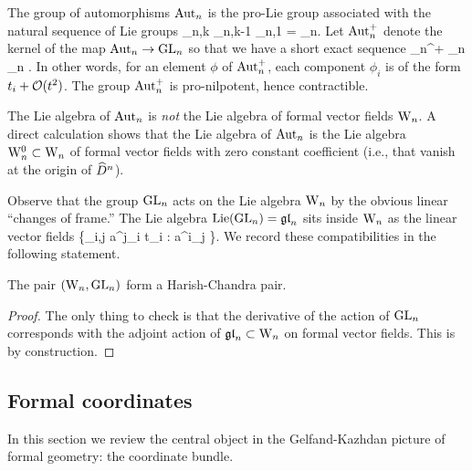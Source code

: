 The group of automorphisms ${\rm Aut}_n$ is the pro-Lie group associated with the natural sequence of Lie groups
\ben
\cdots \to \Aut_{n,k} \to \Aut_{n,k-1} \to \cdots \to \Aut_{n,1} = \GL_n.
\een
Let ${\rm Aut}_n^+$ denote the kernel of the map ${\rm Aut}_n \to {\rm GL}_n$ so that we have a short exact sequence
 \to \Aut_n^+ \to \Aut_n \to \GL_n  .
\een
In other words, for an element $\phi$ of ${\rm Aut}_n^+$, each component
$\phi_i$ is of the form $t_i + \mathcal O(t^2)$. The group ${\rm Aut}_n^+$ is
pro-nilpotent, hence contractible. 

The Lie algebra of ${\rm Aut}_n$ is {\em not} the Lie algebra of formal
vector fields ${{\rm W}_n}$. A direct
calculation shows that the Lie algebra of ${\rm Aut}_n$ is the Lie algebra ${{\rm W}^0_n} \subset {{\rm W}_n}$ of formal vector fields with zero constant coefficient (i.e., that vanish at the origin of $\widehat{D}^n$). 

Observe that the group ${\rm GL}_n$ acts on the Lie algebra ${{\rm W}_n}$ by the obvious linear ``changes of frame.''
The Lie algebra ${\rm Lie}({{\rm GL}_n}) = {\mathfrak{gl}}_n$ sits inside ${{\rm W}_n}$ as the linear vector fields
\ben
\left\{\sum_{i,j} a^j_i t_i  \; : \; a^{i}_j \in \CC \right\}.
\een 
We record these compatibilities in the following statement.

\begin{lem} 
The pair $({{\rm W}_n}, {\rm GL}_n)$ form a Harish-Chandra pair.
\end{lem}
\begin{proof} The only thing to check is that the derivative of the
  action of ${\rm GL}_n$ corresponds with the adjoint action of ${\mathfrak{gl}}_n
  \subset {{\rm W}_n}$ on formal vector fields. This is by construction. 
\end{proof}

\subsection{Formal coordinates}

In this section we review the central object in the Gelfand-Kazhdan
picture of formal geometry: the coordinate bundle.


